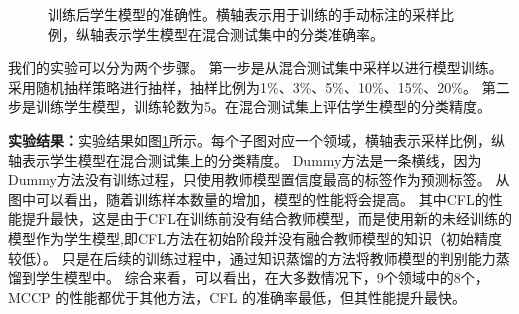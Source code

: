 \documentclass[fontset=macnew,UTF8]{article} %
\begin{document}
\begin{figure}[h!]
{\begin{minipage}[b]{.3\linewidth}
		\end{minipage}
	}
	\caption{训练后学生模型的准确性。横轴表示用于训练的手动标注的采样比例，纵轴表示学生模型在混合测试集中的分类准确率。}
	\label{major_results}
\end{figure}

我们的实验可以分为两个步骤。 第一步是从混合测试集中采样以进行模型训练。采用随机抽样策略进行抽样，抽样比例为1\%、3\%、5\%、10\%、15\%、20\%\cite{shen2020multiple}。 第二步是训练学生模型，训练轮数为5。在混合测试集上评估学生模型的分类精度。

\textbf{实验结果：}实验结果如图\ref{major_results}所示。每个子图对应一个领域，横轴表示采样比例，纵轴表示学生模型在混合测试集上的分类精度。 Dummy方法是一条横线，因为Dummy方法没有训练过程，只使用教师模型置信度最高的标签作为预测标签。 从图中可以看出，随着训练样本数量的增加，模型的性能将会提高。 其中CFL的性能提升最快，这是由于CFL在训练前没有结合教师模型，而是使用新的未经训练的模型作为学生模型,即CFL方法在初始阶段并没有融合教师模型的知识（初始精度较低）。 只是在后续的训练过程中，通过知识蒸馏的方法将教师模型的判别能力蒸馏到学生模型中。 综合来看，可以看出，在大多数情况下，9个领域中的8个，MCCP 的性能都优于其他方法，CFL 的准确率最低，但其性能提升最快。
\end{document}
